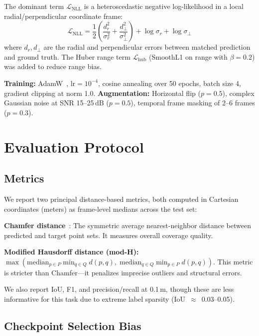 \documentclass[conference]{IEEEtran}
\begin{document}
The dominant term $\mathcal{L}_{\text{NLL}}$ is a heteroscedastic negative log-likelihood in a local radial/perpendicular coordinate frame:
\begin{equation}
  \mathcal{L}_{\text{NLL}} = \frac{1}{2}\!\left(\!\frac{d_r^2}{\sigma_r^2} + \frac{d_\perp^2}{\sigma_\perp^2}\!\right) + \log\sigma_r + \log\sigma_\perp
\end{equation}
where $d_r, d_\perp$ are the radial and perpendicular errors between matched prediction and ground truth.
The Huber range term $\mathcal{L}_{\text{hub}}$ (SmoothL1 on range with $\beta\!=\!0.2$) was added to reduce range bias.

\textbf{Training:} AdamW~\cite{loshchilov2019adamw}, $\text{lr}\!=\!10^{-4}$, cosine annealing over 50 epochs, batch size 4, gradient clipping at norm 1.0.
\textbf{Augmentation:} Horizontal flip ($p\!=\!0.5$), complex Gaussian noise at SNR 15--25\,dB ($p\!=\!0.5$), temporal frame masking of 2--6 frames ($p\!=\!0.3$).

\section{Evaluation Protocol}

\subsection{Metrics}

We report two principal distance-based metrics, both computed in Cartesian coordinates (meters) as frame-level medians across the test set:

\textbf{Chamfer distance}~\cite{fan2017chamfer}: The symmetric average nearest-neighbor distance between predicted and target point sets. It measures overall coverage quality.

\textbf{Modified Hausdorff distance (mod-H):} $\max(\text{median}_{p \in P} \min_{q \in Q} d(p,q),\;\text{median}_{q \in Q} \min_{p \in P} d(p,q))$.
This metric is stricter than Chamfer---it penalizes imprecise outliers and structural errors.

We also report IoU, F1, and precision/recall at 0.1\,m, though these are less informative for this task due to extreme label sparsity (IoU~$\approx$~0.03--0.05).

\subsection{Checkpoint Selection Bias}
\end{document}
